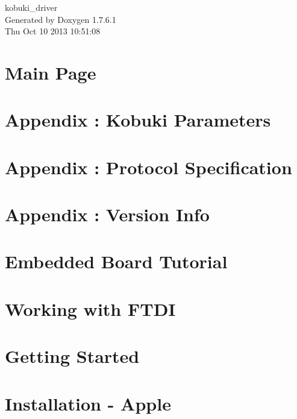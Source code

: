 \documentclass[a4paper]{book}
\begin{document}
\begin{titlepage}
\vspace*{7cm}
\begin{center}
{\Large kobuki\-\_\-driver }\\
\vspace*{1cm}
{\large \-Generated by Doxygen 1.7.6.1}\\
\vspace*{0.5cm}
{\small Thu Oct 10 2013 10:51:08}\\
\end{center}
\end{titlepage}
\clearemptydoublepage
{}
\tableofcontents
\clearemptydoublepage
{}
\chapter{\-Main \-Page}
\label{index}
\chapter{\-Appendix \-: \-Kobuki \-Parameters}
\label{enAppendixKobukiParameters}

\chapter{\-Appendix \-: \-Protocol \-Specification}
\label{enAppendixProtocolSpecification}

\chapter{\-Appendix \-: \-Version \-Info}
\label{enAppendixVersionInfo}

\chapter{\-Embedded \-Board \-Tutorial}
\label{enEmbeddedBoardTutorial}

\chapter{\-Working with \-F\-T\-D\-I}
\label{enFtdiGuide}

\chapter{\-Getting \-Started}
\label{enGettingStartedGuide}

\chapter{\-Installation -\/ \-Apple}
\label{koInstallationAppleGuide}

\end{document}
